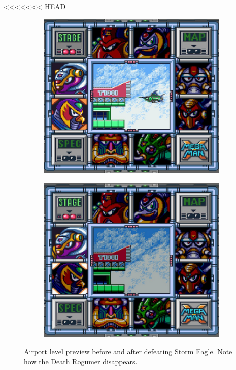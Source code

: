 <<<<<<< HEAD
\begin{figure}[htp]
	\centering
\begin{subfigure}{0.4\linewidth}
	\centering
	\includegraphics[width=\linewidth]{figures/X1/Storm_eagle/Storm_prev_1.jpg}
	\caption{}
\end{subfigure}
\begin{subfigure}{0.4\linewidth}
	\centering
	\includegraphics[width=\linewidth]{figures/X1/Storm_eagle/Storm_prev_2.jpg}
	\caption{}
\end{subfigure}
\caption{Airport level preview before and after defeating Storm Eagle. Note how the Death Rogumer disappears.}
\end{figure}

